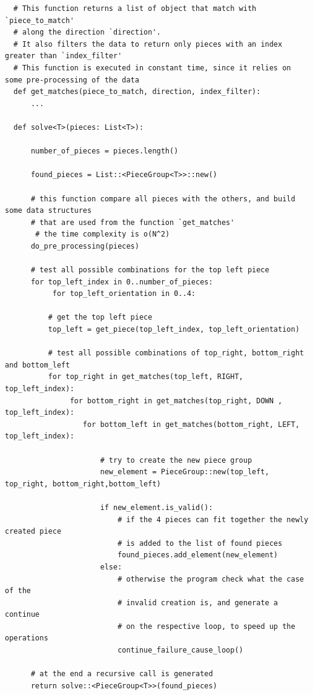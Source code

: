\documentclass[epsfig,a4paper,11pt,titlepage,twoside,openany]{article}
\begin{document}
\cleardoublepage
\begin{minipage}{\textwidth}
\begin{lstlisting}
  # This function returns a list of object that match with `piece_to_match'
  # along the direction `direction'.
  # It also filters the data to return only pieces with an index greater than `index_filter'
  # This function is executed in constant time, since it relies on some pre-processing of the data
  def get_matches(piece_to_match, direction, index_filter):
      ...

  def solve<T>(pieces: List<T>):

      number_of_pieces = pieces.length()

      found_pieces = List::<PieceGroup<T>>::new()

      # this function compare all pieces with the others, and build some data structures
      # that are used from the function `get_matches'
	   # the time complexity is o(N^2)
      do_pre_processing(pieces)

      # test all possible combinations for the top left piece
      for top_left_index in 0..number_of_pieces:
	       for top_left_orientation in 0..4:

          # get the top left piece
          top_left = get_piece(top_left_index, top_left_orientation)

          # test all possible combinations of top_right, bottom_right and bottom_left
          for top_right in get_matches(top_left, RIGHT, top_left_index):
	           for bottom_right in get_matches(top_right, DOWN , top_left_index):
                  for bottom_left in get_matches(bottom_right, LEFT, top_left_index):

                      # try to create the new piece group
                      new_element = PieceGroup::new(top_left, top_right, bottom_right,bottom_left)

                      if new_element.is_valid():
                          # if the 4 pieces can fit together the newly created piece
                          # is added to the list of found pieces
                          found_pieces.add_element(new_element)
                      else:
                          # otherwise the program check what the case of the 
                          # invalid creation is, and generate a continue
                          # on the respective loop, to speed up the operations
                          continue_failure_cause_loop()

      # at the end a recursive call is generated 
      return solve::<PieceGroup<T>>(found_pieces)

\end{lstlisting}
\end{minipage}
\end{document}
